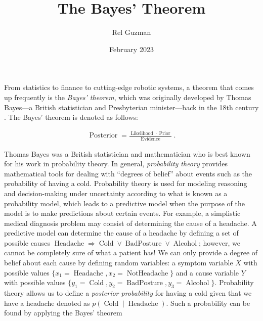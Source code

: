 

\DeclareMathOperator*{\argmax}{argmax} %

\title{The Bayes' Theorem}

\author{Rel Guzman}
\date{February 2023}




\maketitle


From statistics to finance to cutting-edge robotic systems, a theorem that comes up frequently is the \textit{Bayes' theorem}, which was originally developed by Thomas Bayes—a British statistician and Presbyterian minister—back in the 18th century \parencite{andersson2022introduction}. The Bayes' theorem is denoted as follows:

\begin{align}
\operatorname{Posterior} = \frac{\operatorname{Likelihood} \cdot \operatorname{Prior}}{\operatorname{Evidence}}~.
\end{align}

Thomas Bayes was a British statistician and mathematician who is best known for his work in probability theory. In general, \textit{probability theory} provides mathematical tools for dealing with \enquote{degrees of belief} \parencite{russell2010artificial} about events such as the probability of having a cold. Probability theory is used for modeling reasoning and decision-making under uncertainty according to what is known as a probability model, which leads to a predictive model when the purpose of the model is to make predictions about certain events. For example, a simplistic medical diagnosis problem may consist of determining the cause of a headache. A predictive model can determine the cause of a headache by defining a set of possible causes $\operatorname{Headache} \Rightarrow \operatorname{Cold} \lor \operatorname{BadPosture} \lor \operatorname{Alcohol}$; however, we cannot be completely sure of what a patient has! We can only provide a degree of belief about each cause by defining random variables: a symptom variable $X$ with possible values $\{x_1=\operatorname{Headache}, x_2=\operatorname{NotHeadache}\}$ and a cause variable $Y$ with possible values $\{y_1=\operatorname{Cold}, y_2=\operatorname{BadPosture}, y_3=\operatorname{Alcohol}\}$. Probability theory allows us to define a \textit{posterior probability} for having a cold given that we have a headache denoted as $p(\operatorname{Cold} \mid \operatorname{Headache})$. Such a probability can be found by applying the Bayes' theorem

